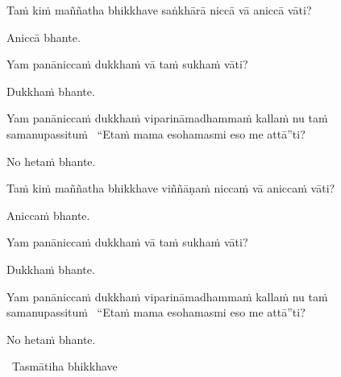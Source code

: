 \begin{pali-hang}
  Taṁ kiṁ maññatha bhikkhave saṅkhārā niccā vā aniccā vāti?
\end{pali-hang}
\begin{pali-hangtogether}
  Aniccā bhante.
\end{pali-hangtogether}
\begin{pali-hangtogether}
  Yam panāniccaṁ dukkhaṁ vā taṁ sukhaṁ vāti?
\end{pali-hangtogether}
\begin{pali-hangtogether}
  Dukkhaṁ bhante.
\end{pali-hangtogether}
\begin{pali-hangtogether}
  Yam panāniccaṁ dukkhaṁ viparināmadhammaṁ kallaṁ nu taṁ samanupassituṁ \breathmark\ ``Etaṁ mama esohamasmi eso me attā''ti?
\end{pali-hangtogether}
\begin{pali-hangtogether}
  No hetaṁ bhante.
\end{pali-hangtogether}

\begin{pali-hang}
  Taṁ kiṁ maññatha bhikkhave viññāṇaṁ niccaṁ vā aniccaṁ vāti?
\end{pali-hang}
\begin{pali-hangtogether}
  Aniccaṁ bhante.
\end{pali-hangtogether}
\begin{pali-hangtogether}
  Yam panāniccaṁ dukkhaṁ vā taṁ sukhaṁ vāti?
\end{pali-hangtogether}
\begin{pali-hangtogether}
  Dukkhaṁ bhante.
\end{pali-hangtogether}
\begin{pali-hangtogether}
  Yam panāniccaṁ dukkhaṁ viparināmadhammaṁ kallaṁ nu taṁ samanupassituṁ \breathmark\ ``Etaṁ mama esohamasmi eso me attā''ti?
\end{pali-hangtogether}
\begin{pali-hangtogether}
  No hetaṁ bhante.
\end{pali-hangtogether}

\begin{leader-only}
  \anglebracketleft\ \hspace{-0.5mm}Tasmātiha bhikkhave \hspace{-0.5mm}\anglebracketright\
\end{leader-only}

\vspace{-0.99em} %

